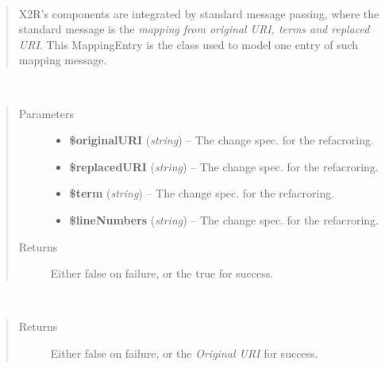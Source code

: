\documentclass[letterpaper,10pt,english]{sphinxmanual}
\begin{document}
\begin{fulllineitems}
\label{docs/api:MappingEntry}~\begin{quote}

X2R's components are integrated by standard message passing, where the standard message is the \emph{mapping from original URI, terms and replaced URI}. This MappingEntry is the class used to model one entry of such mapping message.
\end{quote}

\begin{fulllineitems}
\label{docs/api:MappingEntry::MappingEntry}~\begin{quote}\begin{description}
\item[{Parameters}] \leavevmode\begin{itemize}
\item {} 
\textbf{\$originalURI} (\emph{string}) -- The change spec. for the refacroring.

\item {} 
\textbf{\$replacedURI} (\emph{string}) -- The change spec. for the refacroring.

\item {} 
\textbf{\$term} (\emph{string}) -- The change spec. for the refacroring.

\item {} 
\textbf{\$lineNumbers} (\emph{string}) -- The change spec. for the refacroring.

\end{itemize}

\item[{Returns}] \leavevmode
Either false on failure, or the true for success.

\end{description}\end{quote}

\end{fulllineitems}


\begin{fulllineitems}
\label{docs/api:MappingEntry::getOriginalURI}~\begin{quote}\begin{description}
\item[{Returns}] \leavevmode
Either false on failure, or the \emph{Original URI} for success.


\end{description}
\end{quote}
\end{fulllineitems}
\end{fulllineitems}
\end{document}
